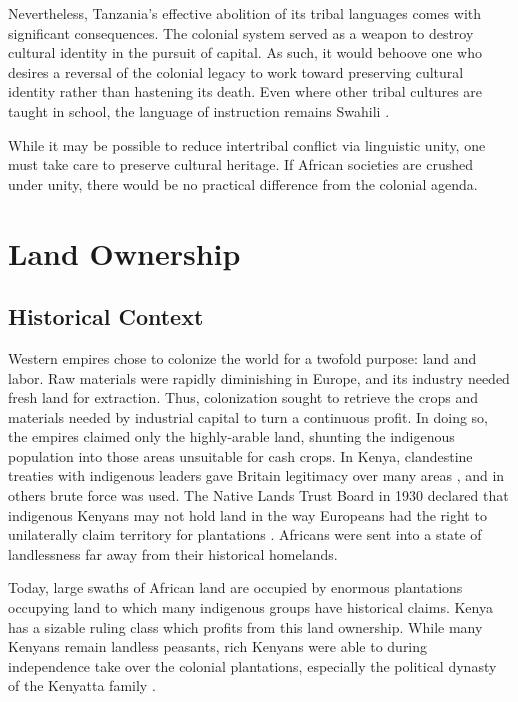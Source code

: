 \documentclass{../../../coursework}
\begin{document}
Nevertheless, Tanzania's effective abolition of its tribal languages comes
with significant consequences. The colonial system served as a weapon to
destroy cultural identity in the pursuit of capital. As such, it would behoove
one who desires a reversal of the colonial legacy to work toward preserving
cultural identity rather than hastening its death. Even where other tribal
cultures are taught in school, the language of instruction remains Swahili
\parencite{Topan2008}.

While it may be possible to reduce intertribal conflict via linguistic unity,
one must take care to preserve cultural heritage. If African societies are
crushed under unity, there would be no practical difference from the colonial
agenda.

\section{Land Ownership}
\subsection{Historical Context}

Western empires chose to colonize the world for a twofold purpose: land and
labor. Raw materials were rapidly diminishing in Europe, and its industry
needed fresh land for extraction. Thus, colonization sought to retrieve the
crops and materials needed by industrial capital to turn a continuous profit.
In doing so, the empires claimed only the highly-arable land, shunting the
indigenous population into those areas unsuitable for cash crops. In Kenya,
clandestine treaties with indigenous leaders gave Britain legitimacy over many
areas \parencite{Rutten1992}, and in others brute force was used. The Native
Lands Trust Board in 1930 declared that indigenous Kenyans may not hold land
in the way Europeans had the right to unilaterally claim territory for
plantations \parencite{Syagga2006}. Africans were sent into a state of
landlessness far away from their historical homelands.

Today, large swaths of African land are occupied by enormous plantations
occupying land to which many indigenous groups have historical claims. Kenya
has a sizable ruling class which profits from this land ownership. While many
Kenyans remain landless peasants, rich Kenyans were able to during
independence take over the colonial plantations, especially the political
dynasty of the Kenyatta family \parencite{Syagga2006}.
\end{document}
